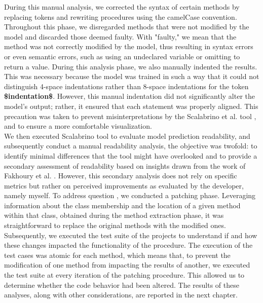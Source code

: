 During this manual analysis, we corrected the syntax of certain methods by replacing tokens and rewriting procedures using the camelCase convention. Throughout this phase, we disregarded methods that were not modified by the model and discarded those deemed faulty. With "faulty," we mean that the method was not correctly modified by the model, thus resulting in syntax errors or even semantic errors, such as using an undeclared variable or omitting to return a value. \newline
During this analysis phase, we also manually indented the results. This was necessary because the model was trained in such a way that it could not distinguish 4-space indentations rather than 8-space indentations for the token \textbf{\$indentation\$}. However, this manual indentation did not significantly alter the model's output; rather, it ensured that each statement was properly aligned. This precaution was taken to prevent misinterpretations by the Scalabrino et al. tool \cite{Scalabrino2018}, and to ensure a more comfortable visualization.\\
We then executed Scalabrino \etal \cite{Scalabrino2018} tool to evaluate model prediction readability, and subsequently conduct a manual readability analysis, the objective was twofold: to identify minimal differences that the tool might have overlooked and to provide a secondary assessment of readability based on insights drawn from the work of Fakhoury et al. \cite{Fakhoury2019}. However, this secondary analysis does not rely on specific metrics but rather on perceived improvements as evaluated by the developer, namely myself. To address question , we conducted a patching phase. Leveraging information about the class membership and the location of a given method within that class, obtained during the method extraction phase, it was straightforward to replace the original methods with the modified ones. Subsequently, we executed the test suite of the projects to understand if and how these changes impacted the functionality of the procedure. The execution of the test cases was atomic for each method, which means that, to prevent the modification of one method from impacting the results of another, we executed the test suite at every iteration of the patching procedure. This allowed us to determine whether the code behavior had been altered. The results of these analyses, along with other considerations, are reported in the next chapter.

